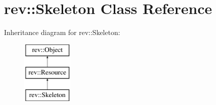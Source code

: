 \hypertarget{classrev_1_1_skeleton}{}\section{rev\+::Skeleton Class Reference}
\label{classrev_1_1_skeleton}
Inheritance diagram for rev\+::Skeleton\+:\begin{figure}[H]
\begin{center}
\leavevmode
\includegraphics[height=3.000000cm]{classrev_1_1_skeleton}
\end{center}
\end{figure}
